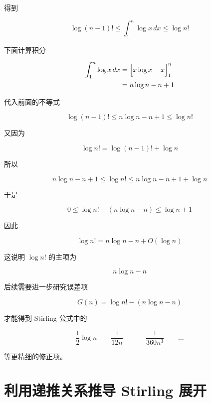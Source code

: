 \documentclass[11pt]{article}%
\begin{document}
    \vspace{1em}
    得到

    \[
    \boxed{
    \log (n-1)!
    \leqslant
    \int_{1}^{n}\log x\,dx
    \leqslant
    \log n!
    }
    \]

    \vspace{1em}
    下面计算积分

    \[
    \begin{aligned}
    \int_{1}^{n}\log x\,dx
    &=
    \Bigl[x\log x-x\Bigr]_{1}^{n}
    \\
    &=
    n\log n-n+1
    \end{aligned}
    \]

    \vspace{1em}
    代入前面的不等式

    \[
    \log (n-1)!
    \leqslant
    n\log n-n+1
    \leqslant
    \log n!
    \]

    \vspace{1em}
    又因为

    \[
    \log n!
    =
    \log (n-1)!+\log n
    \]

    \vspace{1em}
    所以

    \[
    \boxed{
    n\log n-n+1
    \leqslant
    \log n!
    \leqslant
    n\log n-n+1+\log n
    }
    \]

    \vspace{1em}
    于是

    \[
    0
    \leqslant
    \log n!
    -
    (n\log n-n)
    \leqslant
    \log n+1
    \]

    因此

    \[
    \boxed{
    \log n!
    =
    n\log n-n+O(\log n)
    }
    \]

    这说明
    \(\log n!\) 的主项为

    \[
    \boxed{
    n\log n-n
    }
    \]

    后续需要进一步研究误差项

    \[
    G(n)
    =
    \log n!
    -(n\log n-n)
    \]

    才能得到 Stirling 公式中的

    \[
    \frac12\log n
    \qquad
    \frac1{12n}
    \qquad
    -\frac1{360n^3}
    \qquad
    \ldots
    \]

    等更精细的修正项。

    \section{利用递推关系推导 Stirling 展开}
\end{document}

